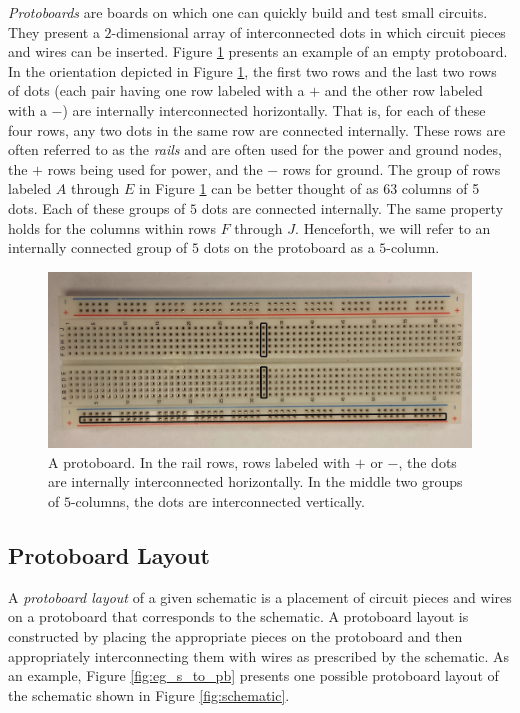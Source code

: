 \textit{Protoboards} are boards on which one can quickly build and test
small circuits. They present a $2$-dimensional array of interconnected dots
in which circuit pieces and wires can be inserted. Figure
\ref{fig:physical_protoboard} presents an example of an empty
protoboard.
In the orientation depicted in Figure \ref{fig:physical_protoboard}, the first
two rows and the last two rows of dots (each pair having one row labeled with a
$+$ and the other row labeled with a $-$) are internally interconnected
horizontally. That
is, for each of these four rows, any two dots in the same row are connected
internally.
These rows are often referred to as the \emph{rails} and are often used for the
power and ground nodes, the $+$ rows being used for power, and the $-$ rows for
ground.
The group of rows labeled $A$ through $E$ in Figure \ref{fig:physical_protoboard}
can be better thought of as $63$ columns of 5 dots. Each of these groups of $5$
dots are connected internally. The same property holds for the columns within
rows $F$ through $J$. Henceforth, we will refer to an internally connected
group of $5$ dots on the protoboard as a $5$-column.

\begin{figure}
\begin{center}
\includegraphics[width=\textwidth]{Images/physical_protoboard.jpg}
\caption[Protoboard]{A protoboard. In the rail rows, rows labeled with $+$ or
$-$, the dots are internally interconnected horizontally. In the middle two
groups of $5$-columns, the dots are interconnected vertically.}
\label{fig:physical_protoboard}
\end{center}
\end{figure}

\subsection{Protoboard Layout}
\label{sec:pb_layout}

A \textit{protoboard layout} of a given schematic is a placement of
circuit pieces
and wires on a protoboard that corresponds to the schematic. A protoboard layout
is constructed by
placing the appropriate pieces on the protoboard and then appropriately
interconnecting them with wires as prescribed by the schematic. As an example,
Figure \ref{fig:eg_s_to_pb} presents one possible protoboard layout
of the schematic shown in Figure \ref{fig:schematic}.

